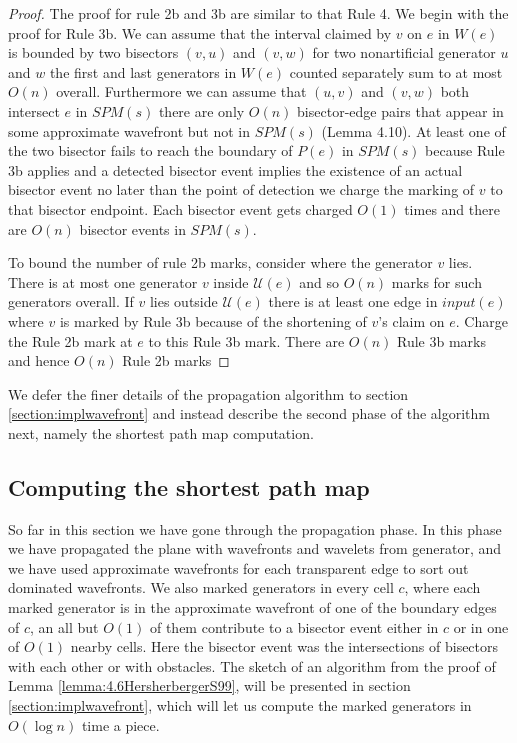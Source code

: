 \begin{proof}
	The proof for rule 2b and 3b are similar to that Rule 4. We begin with the
	proof for Rule 3b. We can assume that the interval claimed by $v$ on $e$ in
	$W(e)$ is bounded by two bisectors $(v,u)$ and $(v,w)$ for two nonartificial
	generator $u$ and $w$ the first and last generators in $W(e)$ counted
	separately sum to at most $O(n)$ overall. Furthermore we can assume that
	$(u,v)$ and $(v,w)$ both intersect $e$ in $SPM(s)$ there are only $O(n)$
	bisector-edge pairs that appear in some approximate wavefront but not in
	$SPM(s)$ (Lemma 4.10). At least one of the two bisector fails to reach the
	boundary of $P(e)$ in $SPM(s)$ because Rule 3b applies and a detected
	bisector event implies the existence of an actual bisector event no later
	than the point of detection we charge the marking of $v$ to that bisector
	endpoint. Each bisector event gets charged $O(1)$ times and there are $O(n)$
	bisector events in $SPM(s)$.

	To bound the number of rule 2b marks, consider where the generator $v$ lies.
	There is at most one generator $v$ inside $\mathcal{U}(e)$ and so $O(n)$
	marks for such generators overall. If $v$ lies outside $\mathcal{U}(e)$
	there is at least one edge in $input(e)$ where $v$ is marked by Rule 3b
	because of the shortening of $v$'s claim on $e$. Charge the Rule 2b mark at
	$e$ to this Rule 3b mark. There are $O(n)$ Rule 3b marks and hence $O(n)$
	Rule 2b marks
\end{proof}
We defer the finer details of the propagation algorithm to section 
\ref{section:implwavefront} and instead describe the second phase of the 
algorithm next, namely the shortest path map computation.

\subsection{Computing the shortest path map}

So far in this section we have gone through the propagation phase. In this phase we have 
propagated the plane with wavefronts and wavelets from generator, and we have used approximate 
wavefronts for each transparent edge to sort out dominated wavefronts. We also marked generators
in every cell $c$, where each marked generator is in the approximate wavefront of one of the 
boundary edges of $c$, an all but $O(1)$ of them contribute to a bisector event either in $c$ or 
in one of $O(1)$ nearby cells. Here the bisector event was the intersections of bisectors with 
each other or with obstacles. The sketch of an algorithm from the proof of Lemma 
\ref{lemma:4.6HersherbergerS99}, will be presented in section \ref{section:implwavefront}, which 
will let us compute the marked generators in $O(\log n)$ time a piece. 

